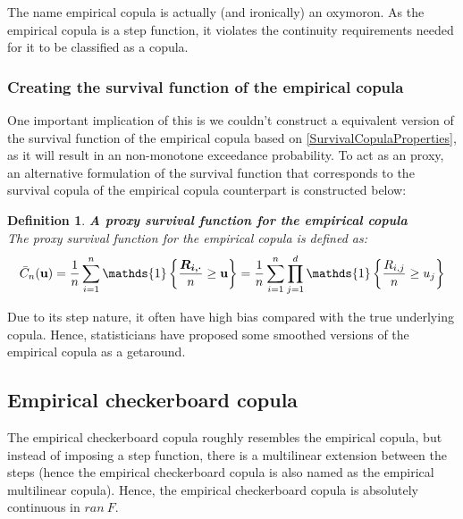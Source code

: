 \documentclass[12pt]{report}
\newtheorem{definition}{Definition}[subsection]
\newcommand{\1}{\mathbf{1}}
\begin{document}
\begin{flushleft}
The name empirical copula is actually (and ironically) an oxymoron. As the empirical copula is a step function, it violates the continuity requirements needed for it to be classified as a copula.\\

\newpage
\subsubsection{Creating the survival function of the empirical copula}
\vspace{0,5cm}
One important implication of this is we couldn't construct a equivalent version of the survival function of the empirical copula based on \ref{SurvivalCopulaProperties}, as it will result in an non-monotone exceedance probability. To act as an proxy, an alternative formulation of the survival function that corresponds to the survival copula of the empirical copula counterpart is constructed below:

\begin{definition}\label{SurvECDef}
\textbf{A proxy survival function for the empirical copula} \\
The proxy survival function for the empirical copula is defined as:
\begin{align*}
\Bar{C}_{n}(\textbf{u}) = \frac{1}{n} \sum\limits_{i = 1}^{n} \mathds{1}\left\{ \frac{\boldsymbol{R_{i,\cdot}}}{n} \ge \textbf{u} \right\} = \frac{1}{n} \sum\limits_{i = 1}^{n} \prod\limits_{j = 1}^{d} \mathds{1}\left\{ \frac{R_{i,j}}{n} \ge u_{j} \right\}
\end{align*}
\end{definition}
Due to its step nature, it often have high bias compared with the true underlying copula. Hence, statisticians have proposed some smoothed versions of the empirical copula as a getaround.

\vspace{0.5cm}
\subsection{Empirical checkerboard copula}
\vspace{0.5cm}

The empirical checkerboard copula roughly resembles the empirical copula, but instead of imposing a step function, there is a multilinear extension between the steps (hence the empirical checkerboard copula is also named as the empirical multilinear copula). Hence, the empirical checkerboard copula is absolutely continuous in $ran \: F$.


\end{flushleft}
\end{document}
